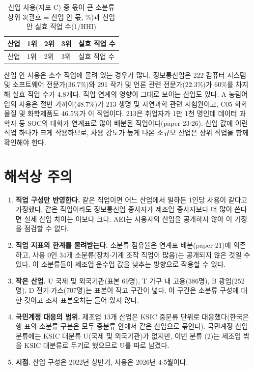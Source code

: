\documentclass[11pt]{article}
\begin{document}
\begin{footnotesize}
\begin{longtable}{L{3.0cm}L{4.2cm}L{4.2cm}L{4.2cm}R{1.2cm}}
\caption{산업 사용(지표 C) 중 몫이 큰 소분류 상위 3(괄호 = 산업 안 몫, \%)과 산업 안 실효 직업 수(1/HHI)}\label{tab:top}\\
\toprule
산업 & 1위 & 2위 & 3위 & 실효 직업 수 \\
\midrule
\endfirsthead
\toprule
산업 & 1위 & 2위 & 3위 & 실효 직업 수 \\
\midrule
\endhead

\bottomrule
\end{longtable}
\end{footnotesize}

산업 안 사용은 소수 직업에 몰려 있는 경우가 많다. 정보통신업은 222 컴퓨터 시스템 및 소프트웨어 전문가(36.7\%)와 291 작가 및 언론 관련 전문가(22.3\%)가 60\%를 차지해 실효 직업 수가 4.8개다. 직업 연계의 영향이 그대로 보이는 산업도 있다. A 농림어업의 사용은 절반 가까이(48.7\%)가 213 생명 및 자연과학 관련 시험원이고, C05 화학물질 및 화학제품도 46.5\%가 이 직업이다. 213은 취업자가 1만 1천 명인데 데이터 과학자 등 SOC의 대화가 연계표로 많이 배분된 직업이다(paper 23$\cdot$26). 산업 값에 이런 직업 하나가 크게 작용하므로, 사용 강도가 높게 나온 소규모 산업은 상위 직업을 함께 확인해야 한다.

\section{해석상 주의}

\begin{enumerate}[leftmargin=*]
  \item \textbf{직업 구성만 반영한다.} 같은 직업이면 어느 산업에서 일하든 1인당 사용이 같다고 가정했다. 같은 직업이라도 정보통신업 종사자가 제조업 종사자보다 더 많이 쓴다면 실제 산업 차이는 이보다 크다. AEI는 사용자의 산업을 공개하지 않아 이 가정을 점검할 수 없다.
  \item \textbf{직업 지표의 한계를 물려받는다.} 소분류 점유율은 연계표 배분(paper 21)에 의존하고, 사용 0인 34개 소분류(장치$\cdot$기계 조작 직업이 많음)는 공개되지 않은 것일 수 있다. 이 소분류들이 제조업$\cdot$운수업 값을 낮추는 방향으로 작용할 수 있다.
  \item \textbf{작은 산업.} U 국제 및 외국기관(표본 69명), T 가구 내 고용(386명), B 광업(252명), D 전기$\cdot$가스(707명)는 표본이 작고 구간이 넓다. 이 구간은 소분류 구성에 대한 것이고 조사 표본오차는 들어 있지 않다.
  \item \textbf{국민계정 대응의 범위.} 제조업 13개 산업은 KSIC 중분류 단위로 대응했다(한국은행 표의 소분류 구분은 모두 중분류 안에서 같은 산업으로 묶인다). 국민계정 산업분류에는 KSIC 대분류 U(국제 및 외국기관)가 없지만, 이번 분류 (2)는 제조업 밖을 KSIC 대분류로 두기로 했으므로 U를 따로 남겼다.
  \item \textbf{시점.} 산업 구성은 2022년 상반기, 사용은 2026년 4$\cdot$5월이다.
\end{enumerate}
\end{document}
